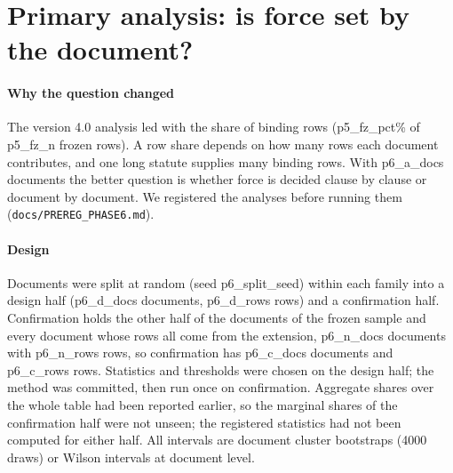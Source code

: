 \documentclass[conference]{IEEEtran}
\begin{document}
\section{Primary analysis: is force set by the document?}\label{sec:primary}
\paragraph{Why the question changed} The version 4.0 analysis led with the share of binding rows ({{p5_fz_pct}}\% of {{p5_fz_n}} frozen rows). A row share depends on how many rows each document contributes, and one long statute supplies many binding rows. With {{p6_a_docs}} documents the better question is whether force is decided clause by clause or document by document. We registered the analyses before running them (\texttt{docs/PREREG\_PHASE6.md}).
\paragraph{Design} Documents were split at random (seed {{p6_split_seed}}) within each family into a design half ({{p6_d_docs}} documents, {{p6_d_rows}} rows) and a confirmation half. Confirmation holds the other half of the documents of the frozen sample and every document whose rows all come from the extension, {{p6_n_docs}} documents with {{p6_n_rows}} rows, so confirmation has {{p6_c_docs}} documents and {{p6_c_rows}} rows. Statistics and thresholds were chosen on the design half; the method was committed, then run once on confirmation. Aggregate shares over the whole table had been reported earlier, so the marginal shares of the confirmation half were not unseen; the registered statistics had not been computed for either half. All intervals are document cluster bootstraps (4000 draws) or Wilson intervals at document level.
\end{document}
